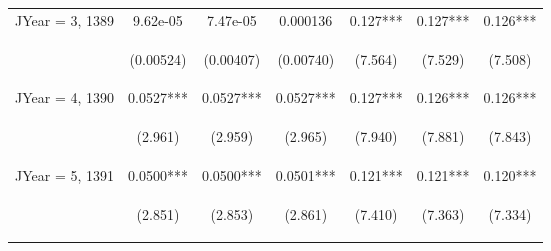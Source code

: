 \documentclass[]{article}
\begin{document}
\begin{center}
\begin{tabular}{lcccccc}
JYear = 3, 1389 & 9.62e-05 & 7.47e-05 & 0.000136 & 0.127*** & 0.127*** & 0.126*** \\
\vspace{4pt} & \begin{footnotesize}(0.00524)\end{footnotesize} & \begin{footnotesize}(0.00407)\end{footnotesize} & \begin{footnotesize}(0.00740)\end{footnotesize} & \begin{footnotesize}(7.564)\end{footnotesize} & \begin{footnotesize}(7.529)\end{footnotesize} & \begin{footnotesize}(7.508)\end{footnotesize} \\
JYear = 4, 1390 & 0.0527*** & 0.0527*** & 0.0527*** & 0.127*** & 0.126*** & 0.126*** \\
\vspace{4pt} & \begin{footnotesize}(2.961)\end{footnotesize} & \begin{footnotesize}(2.959)\end{footnotesize} & \begin{footnotesize}(2.965)\end{footnotesize} & \begin{footnotesize}(7.940)\end{footnotesize} & \begin{footnotesize}(7.881)\end{footnotesize} & \begin{footnotesize}(7.843)\end{footnotesize} \\
JYear = 5, 1391 & 0.0500*** & 0.0500*** & 0.0501*** & 0.121*** & 0.121*** & 0.120*** \\
\vspace{4pt} & \begin{footnotesize}(2.851)\end{footnotesize} & \begin{footnotesize}(2.853)\end{footnotesize} & \begin{footnotesize}(2.861)\end{footnotesize} & \begin{footnotesize}(7.410)\end{footnotesize} & \begin{footnotesize}(7.363)\end{footnotesize} & \begin{footnotesize}(7.334)\end{footnotesize} \\

\end{tabular}
\end{center}
\end{document}
